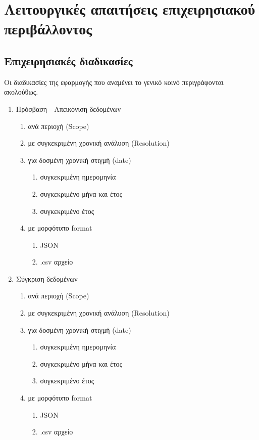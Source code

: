 \documentclass[a4paper,12pt, oneside]{article}
\begin{document}
\section{Λειτουργικές απαιτήσεις επιχειρησιακού περιβάλλοντος}
\subsection{Επιχειρησιακές διαδικασίες}
Οι διαδικασίες της εφαρμογής που αναμένει το γενικό κοινό περιγράφονται ακολούθως.
\renewcommand{\theenumi}{\Roman{enumi}}
\renewcommand{\theenumii}{\arabic{enumii}}
\renewcommand{\theenumiii}{\alph{enumiii}}

\begin{enumerate}
   \item Πρόσβαση - Απεικόνιση δεδομένων
      \begin{enumerate}
     \item ανά περιοχή \textlatin{(Scope)}
     \item με συγκεκριμένη χρονική ανάλυση \textlatin{(Resolution)}
     \item για δοσμένη χρονική στιγμή \textlatin{(date)}
     \begin{enumerate}
  	\item συγκεκριμένη ημερομηνία
   	\item συγκεκριμένο μήνα και έτος	   	
	\item συγκεκριμένο έτος
     \end{enumerate}
     \item με μορφότυπο \textlatin{format}
     \begin{enumerate}
  	\item \textlatin{JSON}
   	\item \textlatin{.csv} αρχείο
     \end{enumerate}
   \end{enumerate}
   \item Σύγκριση δεδομένων
       \begin{enumerate}
     \item ανά περιοχή \textlatin{(Scope)}
     \item με συγκεκριμένη χρονική ανάλυση \textlatin{(Resolution)}
     \item για δοσμένη χρονική στιγμή \textlatin{(date)}
     \begin{enumerate}
  	\item συγκεκριμένη ημερομηνία
   	\item συγκεκριμένο μήνα και έτος	   	
	\item συγκεκριμένο έτος
     \end{enumerate}
     \item με μορφότυπο \textlatin{format}
     \begin{enumerate}
  	\item \textlatin{JSON}
   	\item \textlatin{.csv} αρχείο
     \end{enumerate}
   \end{enumerate}


\end{enumerate}
\end{document}
